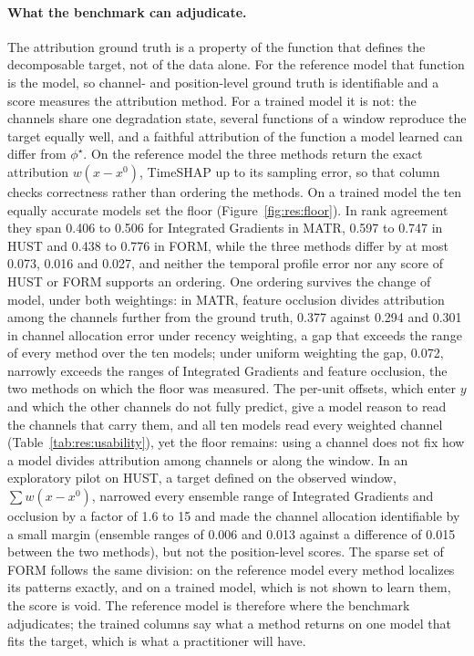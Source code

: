 \documentclass{article}
\begin{document}
\paragraph{What the benchmark can adjudicate.}
The attribution ground truth is a property of the function that defines the decomposable target, not of the data alone. For the reference model that function is the model, so channel- and position-level ground truth is identifiable and a score measures the attribution method. For a trained model it is not: the channels share one degradation state, several functions of a window reproduce the target equally well, and a faithful attribution of the function a model learned can differ from $\phi^{\star}$. On the reference model the three methods return the exact attribution $w(x - x^{0})$, TimeSHAP up to its sampling error, so that column checks correctness rather than ordering the methods. On a trained model the ten equally accurate models set the floor (Figure~\ref{fig:res:floor}). In rank agreement they span 0.406 to 0.506 for Integrated Gradients in MATR, 0.597 to 0.747 in HUST and 0.438 to 0.776 in FORM, while the three methods differ by at most 0.073, 0.016 and 0.027, and neither the temporal profile error nor any score of HUST or FORM supports an ordering. One ordering survives the change of model, under both weightings: in MATR, feature occlusion divides attribution among the channels further from the ground truth, 0.377 against 0.294 and 0.301 in channel allocation error under recency weighting, a gap that exceeds the range of every method over the ten models; under uniform weighting the gap, 0.072, narrowly exceeds the ranges of Integrated Gradients and feature occlusion, the two methods on which the floor was measured. The per-unit offsets, which enter $y$ and which the other channels do not fully predict, give a model reason to read the channels that carry them, and all ten models read every weighted channel (Table~\ref{tab:res:usability}), yet the floor remains: using a channel does not fix how a model divides attribution among channels or along the window. In an exploratory pilot on HUST, a target defined on the observed window, $\sum w(x - x^{0})$, narrowed every ensemble range of Integrated Gradients and occlusion by a factor of 1.6 to 15 and made the channel allocation identifiable by a small margin (ensemble ranges of 0.006 and 0.013 against a difference of 0.015 between the two methods), but not the position-level scores. The sparse set of FORM follows the same division: on the reference model every method localizes its patterns exactly, and on a trained model, which is not shown to learn them, the score is void. The reference model is therefore where the benchmark adjudicates; the trained columns say what a method returns on one model that fits the target, which is what a practitioner will have.
\end{document}
